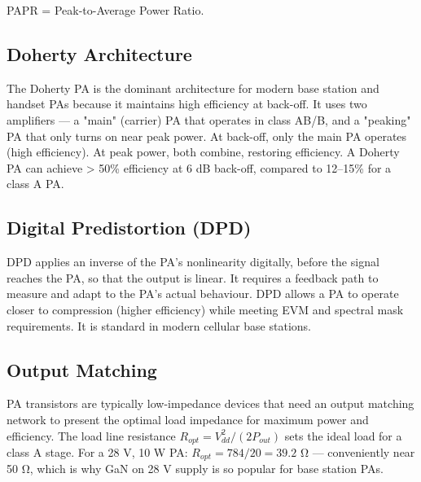       

PAPR = Peak-to-Average Power Ratio.

      

\subsection{Doherty Architecture}

      

The Doherty PA is the dominant architecture for modern base station and handset PAs because it maintains high efficiency at back-off. It uses two amplifiers — a "main" (carrier) PA that operates in class AB/B, and a "peaking" PA that only turns on near peak power. At back-off, only the main PA operates (high efficiency). At peak power, both combine, restoring efficiency. A Doherty PA can achieve \textgreater{} 50\% efficiency at 6 dB back-off, compared to 12–15\% for a class A PA.

      

\subsection{Digital Predistortion (DPD)}

      

DPD applies an inverse of the PA's nonlinearity digitally, before the signal reaches the PA, so that the output is linear. It requires a feedback path to measure and adapt to the PA's actual behaviour. DPD allows a PA to operate closer to compression (higher efficiency) while meeting EVM and spectral mask requirements. It is standard in modern cellular base stations.

      

\subsection{Output Matching}

      

PA transistors are typically low-impedance devices that need an output matching network to present the optimal load impedance for maximum power and efficiency. The load line resistance $R_{opt} = V_{dd}^2 / (2 P_{out})$ sets the ideal load for a class A stage. For a 28 V, 10 W PA: $R_{opt} = 784/20 = 39.2$ Ω — conveniently near 50 Ω, which is why GaN on 28 V supply is so popular for base station PAs.



